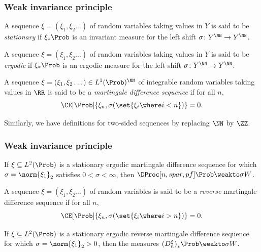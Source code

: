 \documentclass[shortlabels, 9pt, aspectratio=2013]{beamer}
\begin{document}
\begin{frame}
  \frametitle{Weak invariance principle}
  \begin{definition}
    A sequence \(\xi = (\xi_1,\xi_2\dots)\) of random variables taking values in \(Y\) is said to be \emph{stationary} if \(\xi_*\Prob\) is an invariant measure for the left shift \(\sigma \colon Y^{\NN} \to Y^{\NN}\).
  \end{definition}
  \begin{definition}
    A sequence \(\xi = (\xi_1,\xi_2\dots)\) of random variables taking values in \(Y\) is said to be \emph{ergodic} if \(\xi_*\Prob\) is an ergodic measure for the left shift \(\sigma \colon Y^{\NN} \to Y^{\NN}\). 
  \end{definition}
  \begin{definition}
    A sequence \(\xi = (\xi_1,\xi_2\dots) \in L^1(\Prob)^{\NN}\) of integrable random variables taking values in \(\RR\)  is said to be a \emph{martingale difference sequence} if for all \(n\),
    \begin{equation*}
      \CE[\Prob]{\xi_{n}, {\sigma(\set{\xi_i \where i < n})}} = 0.
    \end{equation*}
  \end{definition}
   Similarly, we have definitions for two-sided sequences by replacing \(\NN\) by \(\ZZ\).
\end{frame}

\begin{frame}
  \frametitle{Weak invariance principle}
  \begin{theorem}
    If \(\xi \subseteq L^2(\Prob)\) is a stationary ergodic martingale difference sequence for which \(\sigma = \norm{\xi_1}_2\) satisfies \(0 < \sigma < \infty\), then \(\DProc[n, spar, pf] \Prob \weakto \sigma W\).
  \end{theorem}
  \begin{definition}
    A sequence \(\xi = (\xi_1,\xi_2\dots)\) of random variables is said to be a \textit{reverse} martingale difference sequence if for all \(n\),
    \begin{equation*}
      \CE[\Prob]{\xi_{n}, {\sigma(\set{\xi_i \where i > n})}} = 0.
    \end{equation*}
  \end{definition}
  \begin{corollary}\label{cor:donsker-martingale}
    If \(\xi \subseteq  L^2(\Prob)\) is a stationary ergodic reverse martingale difference sequence for which \(\sigma = \norm{\xi_1}_2 > 0\), then the measures \({(D^{\xi}_n)}_* \Prob \weakto \sigma W\).
  \end{corollary}

\end{frame}
\end{document}
